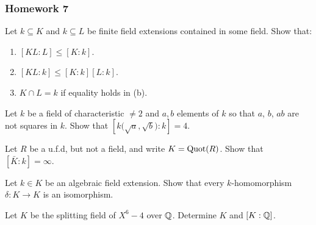 \subsubsection{Homework 7}
\setcounter{exercise}{0}
\setcounter{equation}{0}

\begin{problem}
  Let \(k\subseteq K\) and \(k\subseteq L\) be finite field extensions
  contained in some field. Show that:
  \begin{enumerate}[label=(\alph*),noitemsep]
  \item \([KL:L]\leq[K:k]\).
  \item \([KL:k]\leq[K:k][L:k]\).
  \item \(K\cap L=k\) if equality holds in (b).
  \end{enumerate}
\end{problem}
\begin{solution}
\end{solution}

\begin{problem}
  Let \(k\) be a field of characteristic \(\neq 2\) and \(a,b\) elements of
  \(k\) so that \(a\), \(b\), \(ab\) are not squares in \(k\). Show that
  \(\left[k{\bigl(\sqrt{a},\sqrt{b}\bigr)}:k\right]=4\).
\end{problem}
\begin{solution}
\end{solution}

\begin{problem}
  Let \(R\) be a u.f.d, but not a field, and write \( K=\operatorname{Quot}(R)\). Show
  that \([\bar K:k]=\infty\).
\end{problem}
\begin{solution}
\end{solution}

\begin{problem}
  Let \(k\in K\) be an algebraic field extension. Show that every
  \(k\)-homomorphism \(\delta\colon K\to K\) is an isomorphism.
\end{problem}
\begin{solution}
\end{solution}

\begin{problem}
  Let \(K\) be the splitting field of \(X^6-4\) over \(\mathbb{Q}\). Determine
  \(K\) and \([K:\mathbb{Q}]\).
\end{problem}
\begin{solution}
\end{solution}

